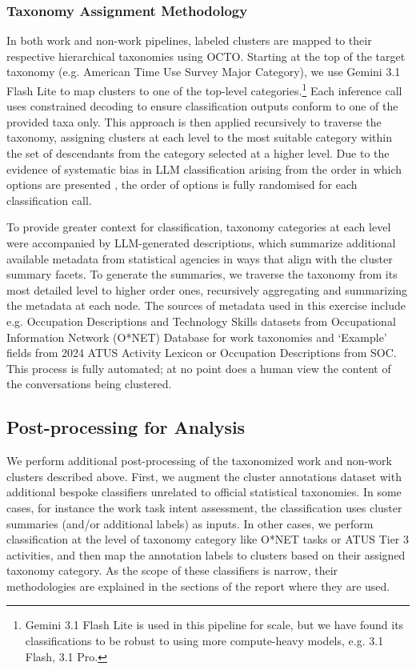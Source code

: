 \documentclass[11pt,a4paper]{article}
\begin{document}
\subsubsection{Taxonomy Assignment Methodology}
In both work and non-work pipelines, labeled clusters are mapped to their respective hierarchical taxonomies using OCTO. Starting at the top of the target taxonomy (e.g. American Time Use Survey Major Category), we use Gemini 3.1 Flash Lite to map clusters to one of the top-level categories.\footnote{Gemini 3.1 Flash Lite is used in this pipeline for scale, but we have found its classifications to be robust to using more compute-heavy models, e.g. 3.1 Flash, 3.1 Pro.} Each inference call uses constrained decoding \citep{https://doi.org/10.48550/arxiv.2407.08103} to ensure classification outputs conform to one of the provided taxa only. This approach is then applied recursively to traverse the taxonomy, assigning clusters at each level to the most suitable category within the set of descendants from the category selected at a higher level. Due to the evidence of systematic bias in LLM classification arising from the order in which options are presented \citep{https://doi.org/10.48550/arxiv.2308.11483, https://doi.org/10.48550/arxiv.2506.14092}, the order of options is fully randomised for each classification call.

To provide greater context for classification, taxonomy categories at each level were accompanied by LLM-generated descriptions, which summarize additional available metadata from statistical agencies in ways that align with the cluster summary facets. To generate the summaries, we traverse the taxonomy from its most detailed level to higher order ones, recursively aggregating and summarizing the metadata at each node. The sources of metadata used in this exercise include e.g. Occupation Descriptions and Technology Skills datasets from Occupational Information Network (O*NET) Database for work taxonomies and `Example’ fields from 2024 ATUS Activity Lexicon or Occupation Descriptions from SOC. This process is fully automated; at no point does a human view the content of the conversations being clustered. 

\subsection{Post-processing for Analysis}
\label{app:app_1_3}

We perform additional post-processing of the taxonomized work and non-work clusters described above. First, we augment the cluster annotations dataset with additional bespoke classifiers unrelated to official statistical taxonomies. In some cases, for instance the work task intent assessment,  the classification uses cluster summaries (and/or additional labels) as inputs.  In other cases, we perform classification at the level of taxonomy category like O*NET tasks or ATUS Tier 3 activities, and then map the annotation labels to clusters based on their assigned taxonomy category. As the scope of these classifiers is narrow, their methodologies are explained in the sections of the report where they are used. 
\end{document}
